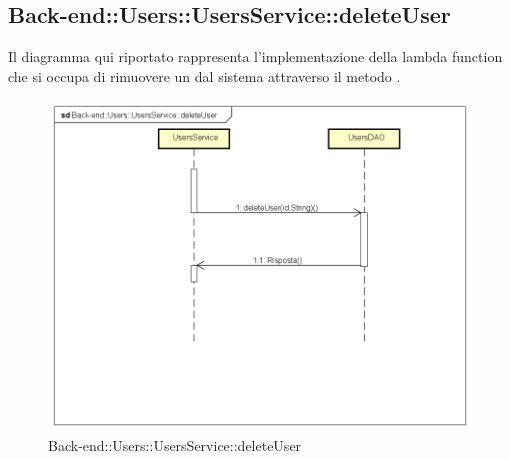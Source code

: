 \subsection{Back-end::Users::UsersService::deleteUser}
Il diagramma qui riportato rappresenta l'implementazione della lambda function che si occupa di rimuovere un  dal sistema attraverso il metodo .
\begin{figure}[h] \centering \includegraphics[width=\textwidth,height=\textheight,keepaspectratio]{images/diagrams/back-end/Ufficial_Backend/Back-endUsersUsersServicedeleteUser.png} 	\caption{Back-end::Users::UsersService::deleteUser}
\end{figure} 
\newpage

